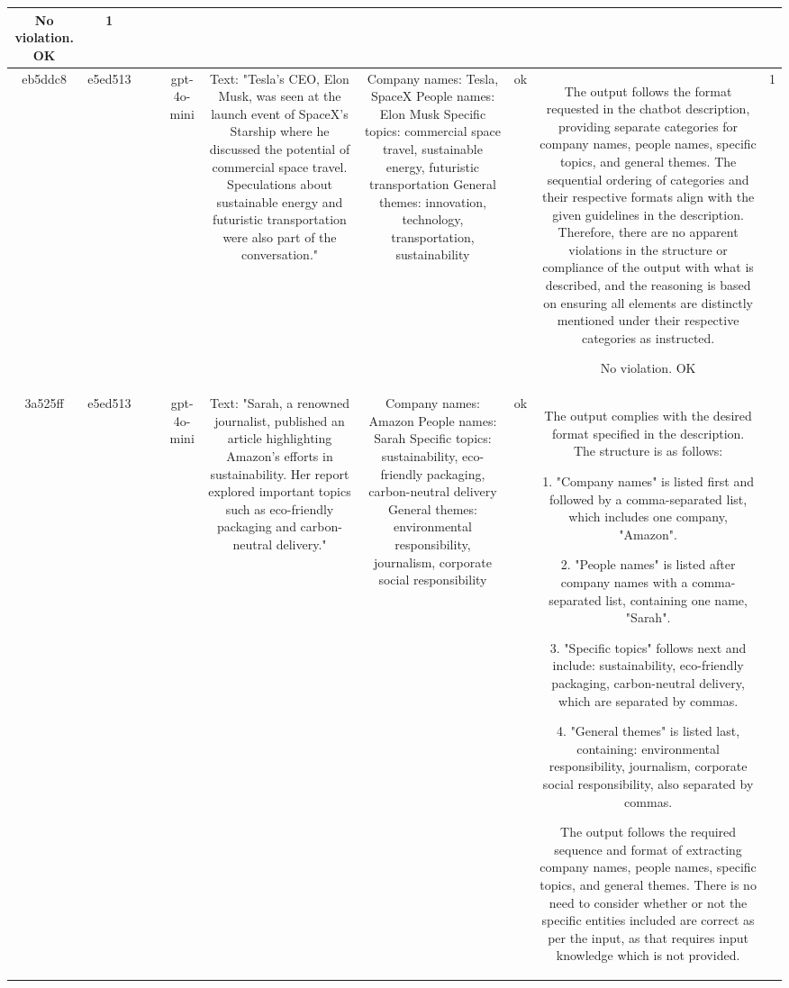 \begin{table}[h!]
\begin{tabular}{|c|c|c|c|c|c|c|c|c|c|}
No violation.
OK & 1\\
\hline
eb5ddc8 & e5ed513 &  &  & gpt-4o-mini & Text: "Tesla's CEO, Elon Musk, was seen at the launch event of SpaceX's Starship where he discussed the potential of commercial space travel. Speculations about sustainable energy and futuristic transportation were also part of the conversation." & Company names: Tesla, SpaceX
People names: Elon Musk
Specific topics: commercial space travel, sustainable energy, futuristic transportation
General themes: innovation, technology, transportation, sustainability & ok & The output follows the format requested in the chatbot description, providing separate categories for company names, people names, specific topics, and general themes. The sequential ordering of categories and their respective formats align with the given guidelines in the description. Therefore, there are no apparent violations in the structure or compliance of the output with what is described, and the reasoning is based on ensuring all elements are distinctly mentioned under their respective categories as instructed.

No violation.
OK & 1\\
\hline
3a525ff & e5ed513 &  &  & gpt-4o-mini & Text: "Sarah, a renowned journalist, published an article highlighting Amazon's efforts in sustainability. Her report explored important topics such as eco-friendly packaging and carbon-neutral delivery." & Company names: Amazon  
People names: Sarah  
Specific topics: sustainability, eco-friendly packaging, carbon-neutral delivery  
General themes: environmental responsibility, journalism, corporate social responsibility   & ok & The output complies with the desired format specified in the description. The structure is as follows:

1. "Company names" is listed first and followed by a comma-separated list, which includes one company, "Amazon".

2. "People names" is listed after company names with a comma-separated list, containing one name, "Sarah".

3. "Specific topics" follows next and include: sustainability, eco-friendly packaging, carbon-neutral delivery, which are separated by commas.

4. "General themes" is listed last, containing: environmental responsibility, journalism, corporate social responsibility, also separated by commas.

The output follows the required sequence and format of extracting company names, people names, specific topics, and general themes. There is no need to consider whether or not the specific entities included are correct as per the input, as that requires input knowledge which is not provided.


\end{tabular}
\end{table}
